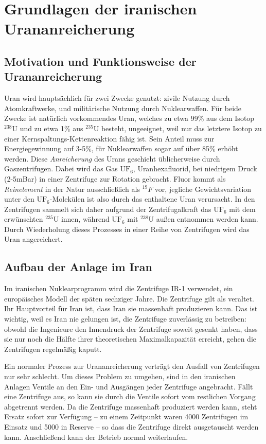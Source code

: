 \documentclass[a4paper]{article}
\begin{document}
\section{Grundlagen der iranischen Urananreicherung}

\subsection{Motivation und Funktionsweise der Urananreicherung}

Uran wird hauptsächlich für zwei Zwecke genutzt: zivile Nutzung durch Atomkraftwerke, und militärische Nutzung durch Nuklearwaffen.
Für beide Zwecke ist natürlich vorkommendes Uran,
welches zu etwa 99\% aus dem Isotop $^{238}\mathrm U$ und zu etwa 1\% aus $^{235}\mathrm U$ besteht, ungeeignet,
weil nur das letztere Isotop zu einer Kernspaltungs-Kettenreaktion fähig ist.
Sein Anteil muss zur Energiegewinnung auf 3-5\%, für Nuklearwaffen sogar auf über 85\% erhöht werden.
Diese \emph{Anreicherung} des Urans geschieht üblicherweise durch Gaszentrifugen.
Dabei wird das Gas $\mathrm{UF}_6$, Uranhexafluorid, bei niedrigem Druck (2-5mBar) in einer Zentrifuge zur Rotation gebracht.
Fluor kommt als \emph{Reinelement} in der Natur ausschließlich als $^{19}F$ vor,
jegliche Gewichtsvariation unter den $\mathrm{UF}_6$-Molekülen ist also durch das enthaltene Uran verursacht.
In den Zentrifugen sammelt sich daher aufgrund der Zentrifugalkraft das $\mathrm{UF}_6$ mit dem erwünschten $^{235}\mathrm U$ innen,
während $\mathrm{UF}_6$ mit $^{238}\mathrm U$ außen entnommen werden kann.
Durch Wiederholung dieses Prozesses in einer Reihe von Zentrifugen wird das Uran angereichert.\cite{wiki:urananreicherung}

\subsection{Aufbau der Anlage im Iran}

Im iranischen Nuklearprogramm wird die Zentrifuge IR-1 verwendet, ein europäisches Modell der späten sechziger Jahre.
Die Zentrifuge gilt als veraltet. Ihr Hauptvorteil für Iran ist, dass Iran sie massenhaft produzieren kann.
Das ist wichtig, weil es Iran nie gelungen ist, die Zentrifuge zuverlässig zu betreiben:
obwohl die Ingenieure den Innendruck der Zentrifuge soweit gesenkt haben, dass sie nur noch die Hälfte ihrer theoretischen Maximalkapazität erreicht,
gehen die Zentrifugen regelmäßig kaputt.

Ein normaler Prozess zur Urananreicherung verträgt den Ausfall von Zentrifugen nur sehr schlecht.
Um dieses Problem zu umgehen, sind in den iranischen Anlagen Ventile an den Ein- und Ausgängen jeder Zentrifuge angebracht.
Fällt eine Zentrifuge aus, so kann sie durch die Ventile sofort vom restlichen Vorgang abgetrennt werden.
Da die Zentrifuge massenhaft produziert werden kann, steht Ersatz sofort zur Verfügung
– zu einem Zeitpunkt waren 4000 Zentrifugen im Einsatz und 5000 in Reserve\cite{tkac} – %
so dass die Zentrifuge direkt ausgetauscht werden kann.
Anschließend kann der Betrieb normal weiterlaufen.
\end{document}
